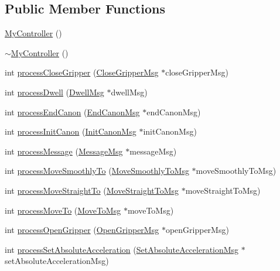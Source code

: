 \subsection*{Public Member Functions}
\begin{DoxyCompactItemize}
\item 
\hyperlink{class_my_controller_a6f2859cd8f87a7c97cf83234a91c854d}{MyController} ()
\item 
\hyperlink{class_my_controller_aa75ca9c8ba2df36c5a37a1e6461edb33}{$\sim$MyController} ()
\item 
int \hyperlink{class_my_controller_afcd5a91653e0c6035274e0d2b287d9ff}{processCloseGripper} (\hyperlink{class_close_gripper_msg}{CloseGripperMsg} $\ast$closeGripperMsg)
\item 
int \hyperlink{class_my_controller_a4e5f21b2e983f04cbb239b125b3b117e}{processDwell} (\hyperlink{class_dwell_msg}{DwellMsg} $\ast$dwellMsg)
\item 
int \hyperlink{class_my_controller_a2d89a8878736628f6be3cb228f10e5d0}{processEndCanon} (\hyperlink{class_end_canon_msg}{EndCanonMsg} $\ast$endCanonMsg)
\item 
int \hyperlink{class_my_controller_abc8fd5a12f022e6b9b38351326d9be50}{processInitCanon} (\hyperlink{class_init_canon_msg}{InitCanonMsg} $\ast$initCanonMsg)
\item 
int \hyperlink{class_my_controller_aee5bcc193cb15db025c2023df3ad04d6}{processMessage} (\hyperlink{class_message_msg}{MessageMsg} $\ast$messageMsg)
\item 
int \hyperlink{class_my_controller_af772f22c2df0e5cf2a88fb517ce849e5}{processMoveSmoothlyTo} (\hyperlink{class_move_smoothly_to_msg}{MoveSmoothlyToMsg} $\ast$moveSmoothlyToMsg)
\item 
int \hyperlink{class_my_controller_a78051383c5b6fa4215af42f243f74a85}{processMoveStraightTo} (\hyperlink{class_move_straight_to_msg}{MoveStraightToMsg} $\ast$moveStraightToMsg)
\item 
int \hyperlink{class_my_controller_ac1b346b099111f8be0cc87de1be77257}{processMoveTo} (\hyperlink{class_move_to_msg}{MoveToMsg} $\ast$moveToMsg)
\item 
int \hyperlink{class_my_controller_a696619700ae953876061cc93dff95973}{processOpenGripper} (\hyperlink{class_open_gripper_msg}{OpenGripperMsg} $\ast$openGripperMsg)
\item 
int \hyperlink{class_my_controller_a71f8c98b796a6905e3258e8505ba9e4d}{processSetAbsoluteAcceleration} (\hyperlink{class_set_absolute_acceleration_msg}{SetAbsoluteAccelerationMsg} $\ast$setAbsoluteAccelerationMsg)

\end{DoxyCompactItemize}
